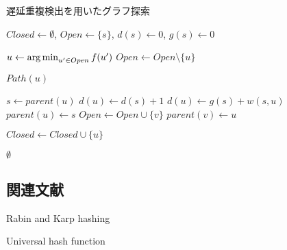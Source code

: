 \begin{algorithm}
\caption{遅延重複検出を用いたグラフ探索}
\label{alg:ddd}
	$Closed \leftarrow \emptyset$, $Open \leftarrow \{s\}$, $d(s) \leftarrow 0$, $g(s) \leftarrow 0$\;
	 {
                $u \leftarrow \operatorname*{arg\,min}_{u' \in Open} f(u')$ \;
	        $Open \leftarrow Open \setminus \{u\} $\;
          
		 {
			\Return $Path(u)$\;
		}

                $s \leftarrow parent(u)$\;
		 {
                  $d(u) \leftarrow d(s) + 1$\;
                  $d(u) \leftarrow g(s) + w(s, u)$\;
		  $parent(u) \leftarrow s$\;
		   {
		    $Open \leftarrow Open \cup \{v\}$\;
		    $parent(v) \leftarrow u$\;
		  }
		}

                 {
                  $Closed \leftarrow Closed \cup \{u\}$\;
                }
 	}
	\Return $\emptyset$\;
\end{algorithm}


\subsection{関連文献}


Rabin and Karp hashing

Universal hash function



